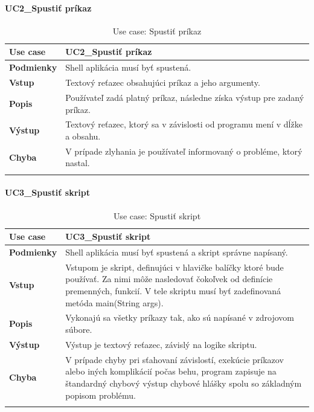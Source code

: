 \paragraph{UC2\_Spustiť príkaz}
\begin{center}
	\begin{longtable}{|p{2.5cm}|p{12.2cm}|}
		\hline
		\textbf{Use case} & UC2\_Spustiť príkaz \\ 
		\hline
		\textbf{Podmienky} & Shell aplikácia musí byť spustená. \\ 
		\hline
		\textbf{Vstup} & Textový reťazec obsahujúci príkaz a jeho argumenty.\\
		\hline
		\textbf{Popis} & Používateľ zadá platný príkaz, následne získa výstup pre zadaný príkaz. \\ 
		\hline
		\textbf{Výstup} & Textový reťazec, ktorý sa v závislosti od programu mení v dĺžke a obsahu.\\
		\hline
		\textbf{Chyba} & V prípade zlyhania je používateľ informovaný o probléme, ktorý nastal.\\
		\hline
		\caption{Use case: Spustiť príkaz}
		\label{table:1}
	\end{longtable}
	
\end{center}
\paragraph{UC3\_Spustiť skript}
\begin{center}
	\begin{longtable}{|p{2.5cm}|p{12.2cm}|}
		\hline
		\textbf{Use case} & UC3\_Spustiť skript \\ 
		\hline
		\textbf{Podmienky} & Shell aplikácia musí byť spustená a skript správne napísaný.\\ 
		\hline
		\textbf{Vstup} & Vstupom je skript, definujúci v hlavičke balíčky ktoré bude používať. Za nimi môže nasledovať čokoľvek od definície premenných, funkcií. V tele skriptu musí byť zadefinovaná metóda main(String args).\\
		\hline
		\textbf{Popis} & Vykonajú sa všetky príkazy tak, ako sú napísané v zdrojovom súbore. \\ 
		\hline
		\textbf{Výstup} & Výstup je textový reťazec, závislý na logike skriptu.\\
		\hline
		\textbf{Chyba} & V prípade chyby pri sťahovaní závislostí, exekúcie príkazov alebo iných komplikácií počas behu, program zapisuje na štandardný chybový výstup chybové hlášky spolu so základným popisom problému.\\
		\hline
		\caption{Use case: Spustiť skript}
		\label{table:1}
	\end{longtable}

\end{center}

